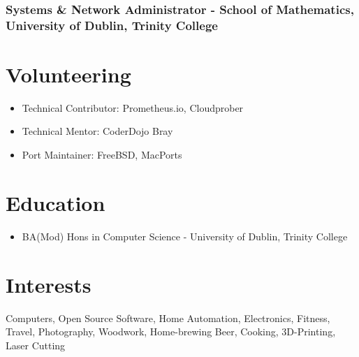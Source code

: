 \documentclass[a4paper, 10pt] {article}
\begin{document}
\subsubsection*{Systems \& Network Administrator - School of Mathematics, University of Dublin, Trinity College}

\section*{Volunteering}

\begin{itemize}[noitemsep]
  \item Technical Contributor: Prometheus.io, Cloudprober
  \item Technical Mentor: CoderDojo Bray
  \item Port Maintainer: FreeBSD, MacPorts
\end{itemize}

\section*{Education}

\begin{itemize}
  \item BA(Mod) Hons in Computer Science - University of Dublin, Trinity College
\end{itemize}

\section*{Interests}

Computers, Open Source Software, Home Automation, Electronics, Fitness, Travel, Photography, Woodwork,
Home-brewing Beer, Cooking, 3D-Printing, Laser Cutting
\end{document}
